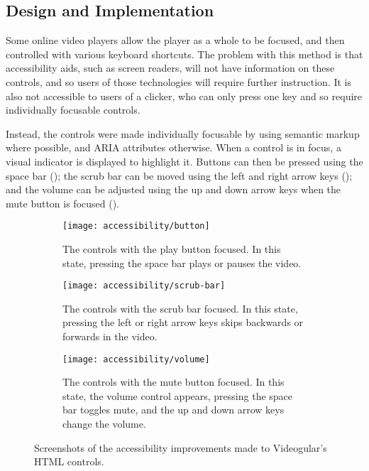 \subsection{Design and Implementation}
Some online video players allow the player as a whole to be focused, and then controlled with various keyboard shortcuts. The problem with this method is that accessibility aids, such as screen readers, will not have information on these controls, and so users of those technologies will require further instruction. It is also not accessible to users of a clicker, who can only press one key and so require individually focusable controls.

Instead, the controls were made individually focusable by using semantic markup where possible, and \gls{ARIA} attributes otherwise. When a control is in focus, a visual indicator is displayed to highlight it. Buttons can then be pressed using the space bar (); the scrub bar can be moved using the left and right arrow keys (); and the volume can be adjusted using the up and down arrow keys when the mute button is focused ().

\begin{figure}
	\begin{subfigure}[]{\textwidth}
		\texttt{[image: accessibility/button]}
		\caption{The controls with the play button focused. In this state, pressing the space bar plays or pauses the video.}
		\label{Figure:Accessibility/Screenshots/Button}
	\end{subfigure}
	\begin{subfigure}[]{\textwidth}
		\texttt{[image: accessibility/scrub-bar]}
		\caption{The controls with the scrub bar focused. In this state, pressing the left or right arrow keys skips backwards or forwards in the video.}
		\label{Figure:Accessibility/Screenshots/ScrubBar}
	\end{subfigure}
	\begin{subfigure}[]{\textwidth}
		\texttt{[image: accessibility/volume]}
		\caption{The controls with the mute button focused. In this state, the volume control appears, pressing the space bar toggles mute, and the up and down arrow keys change the volume.}
		\label{Figure:Accessibility/Screenshots/Volume}
	\end{subfigure}
	\caption{Screenshots of the accessibility improvements made to \gls{Videogular}'s HTML controls.}
	\label{Figure:Accessibility/Screenshots}
\end{figure}

